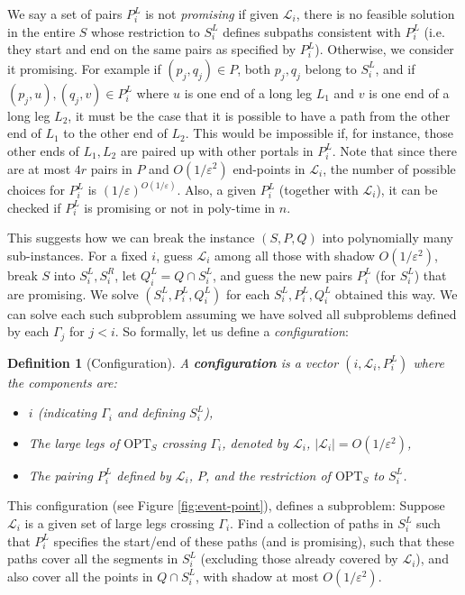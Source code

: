 \documentclass[pdflatex,sn-mathphys-num]{sn-jnl}
\theoremstyle{thmstyleone}
\newtheorem{definition}{Definition} %
\newcommand{\eps}{\varepsilon}
\newcommand{\OPT}{{\text{OPT}}}
\begin{document}
We say a set of pairs $P^L_i$ is not {\em promising} if given $\mathcal L_i$, there is no feasible solution in the
entire $S$ whose restriction to $S^L_i$ defines subpaths consistent with $P^L_i$ 
(i.e. they start and end on the same pairs as specified by $P^L_i$). Otherwise, we consider it promising.
For example if $(p_j,q_j)\in P$,
both $ p_j, q_j $ belong to $S^L_i$, and if $(p_j,u),(q_j,v)\in P^L_i$ where $u$ is one end of a long leg $L_1$
and $v$ is one end of a long leg $L_2$, it must be the case that it is possible to have a path from the other end of $L_1$ to the other end of $L_2$. This would be impossible if, for instance, those other ends of $L_1,L_2$ are paired up with other portals in $P^L_i$. 
Note that since there are at most $4r$ pairs in $P$ and $O(1/\eps^2)$ end-points in $\mathcal L_i$,
the number of possible choices for $P^L_i$ is $(1/\eps)^{O(1/\eps)}$. Also, a given $P^L_i$  (together with $\mathcal L_i$), it can be checked if $ P^L_i $ is promising or not in poly-time in $ n $.

This suggests how we can break the instance $(S,P,Q)$ into polynomially many sub-instances.
For a fixed $i$, guess $\mathcal L_i$ among all those with shadow $O(1/\eps^2)$, break $S$ into $S^L_i,S^R_i$, let $Q^L_i=Q\cap S^L_i$, and guess
the new pairs $P^L_i$ (for $S^L_i$) that are promising. We solve $(S^L_i,P^L_i,Q^L_i)$ for each $S^L_i,P^L_i,Q^L_i$ obtained this way. 
We can solve each such subproblem assuming we have solved all subproblems defined by each $\Gamma_j$ for $j<i$. So formally, let us define a {\em configuration}:
\begin{definition}[Configuration]
 A \textbf{configuration} is a vector $ (i, \mathcal L_i, P^L_i) $ where the components are:
\begin{itemize}
    \item $i$ (indicating $\Gamma_i$ and defining $S^L_i$),
    \item The large legs of $\OPT_S$ crossing $\Gamma_i$, denoted by $\mathcal L_i$, $|\mathcal L_i|=O(1/\eps^2)$,
    \item The pairing $P^L_i$ defined by $\mathcal L_i$, $P$, and the restriction of $\OPT_S$ to $S^L_i$.
\end{itemize}
\end{definition}


This configuration (see Figure \ref{fig:event-point}), defines a subproblem: Suppose $\mathcal L_i$ is a given set of large legs crossing $\Gamma_i$.
Find a collection of paths in $S^L_i$ such that $P^L_i$ specifies the start/end of these paths (and is promising), such that these paths cover all the segments in $S^L_i$ (excluding those already covered by $\mathcal L_i$), and also cover all the points in $Q\cap S^L_i$, with shadow at most $O(1/\eps^2)$. 
\end{document}
